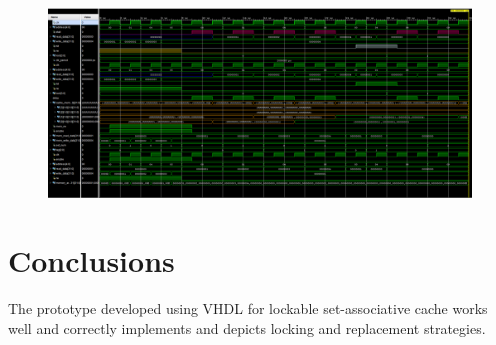 \documentclass[letterpaper,preprint,11pt]{elsarticle}
\begin{document}
\begin{landscape}%
\begin{figure}[h]
\centering
\includegraphics[width=21cm]{Simulation-waveform-colored}
\label{sim}
\end{figure}%

\end{landscape}

\section{Conclusions}

The prototype developed using VHDL for lockable set-associative cache works well and correctly implements and depicts locking and replacement strategies.
\end{document}
